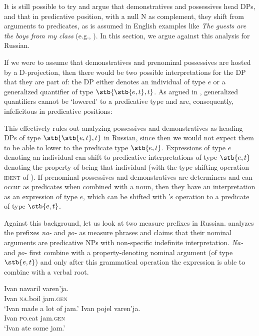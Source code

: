 \documentclass[output=paper,
colorlinks,
citecolor=brown,
newtxmath
]{langscibook}
\begin{document}


It is still possible to try and argue that demonstratives and possessives head DPs, and that in predicative position, with a null N as complement, they shift from arguments to predicates, as is assumed in English examples like \textit{The guests are the boys from my class} (e.g., \citealt{Partee1987}). In this section, we argue against this analysis for Russian.

If we were to assume that demonstratives and prenominal possessives are hosted by a D-projection, then there would be two possible interpretations for the DP that they are part of: the DP either denotes an individual of type $e$ or a generalized quantifier of type $\stb{\stb{e,t}, t}$. As argued in \citet{Landman2003}, generalized quantifiers cannot be `lowered' to a predicative type and are, consequently, infelicitous in predicative positions:


\z

\noindent This effectively rules out analyzing possessives and demonstratives as heading DPs of type $\stb{\stb{e,t}, t}$ in Russian, since then we would not expect them to be able to lower to the predicate type $\stb{e,t}$.
Expressions of type $e$ denoting an individual can shift to predicative interpretations of type $\stb{e,t}$ denoting the property of being that individual (with the type shifting operation \textsc{ident} of \citealt{Partee1987}). If prenominal possessives and demonstratives are determiners and can occur as predicates when combined with a noun, then they have an interpretation as an expression of type $e$, which can be shifted with \citeauthor{Partee1987}'s operation to a predicate of type $\stb{e,t}$. 

Against this background, let us look at two measure prefixes in Russian. \citet{Filip2005} analyzes the prefixes \textit{na-} and \textit{po-} as measure phrases and claims that their nominal arguments are predicative NPs with non-specific indefinite interpretation. \textit{Na-} and \textit{po-} first combine with a property-denoting nominal argument (of type $\stb{e,t}$) and only after this grammatical operation the expression is able to combine with a verbal root. 


\ea\label{napo-demonstratives}
    \ea\label{navaril} \gll Ivan navaril varen'ja.\\
    Ivan {\textsc{na}.boil} jam.\textsc{gen}\\
    \glt `Ivan made a lot of jam.'
    \ex\label{pojel} \gll Ivan pojel varen'ja.\\
    Ivan {\textsc{po}.eat} jam.\textsc{gen}\\
    \glt `Ivan ate some jam.'
\z\z
\end{document}
